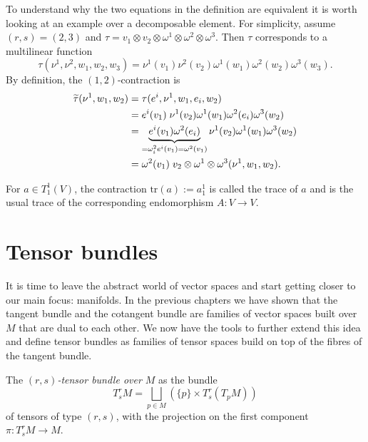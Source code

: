 \begin{example}
  To understand why the two equations in the definition are equivalent it is worth looking at an example over a decomposable element.
  For simplicity, assume $(r,s) = (2,3)$ and $\tau = v_1\otimes v_2\otimes\omega^1\otimes\omega^2\otimes\omega^3$.
  Then $\tau$ corresponds to a multilinear function
  \begin{equation}
    \tau(\nu^1,\nu^2,w_1,w_2,w_3) = \nu^1(v_1)\nu^2(v_2)\omega^1(w_1)\omega^2(w_2)\omega^3(w_3).
  \end{equation}
  By definition, the $(1,2)$-contraction is
  \begin{align}
    \widetilde\tau(\nu^1,w_1,w_2) & = \tau(e^i,\nu^1,w_1,e_i,w_2)                                                                                        \\
                                  & = e^i(v_1)\;\nu^1(v_2)\omega^1(w_1)\omega^2(e_i)\omega^3(w_2)                                                        \\
                                  & = \LaTeXunderbrace{e^i(v_1)\omega^2(e_i)}_{=\omega^2_i e^i (v_1) =\omega^2(v_1)}\nu^1(v_2)\omega^1(w_1)\omega^3(w_2) \\
                                  & = \omega^2(v_1)\; v_2\otimes\omega^1\otimes\omega^3 (\nu^1,w_1,w_2).
  \end{align}
\end{example}

\begin{example}
  For $a\in T_1^1(V)$, the contraction $\mathrm{tr} (a) := a^1_1$ is called the trace of $a$ and is the usual trace of the corresponding endomorphism $A:V\to V$.
\end{example}

\section{Tensor bundles}

It is time to leave the abstract world of vector spaces and start getting closer to our main focus: manifolds.
In the previous chapters we have shown that the tangent bundle and the cotangent bundle are families of vector spaces built over $M$ that are dual to each other.
We now have the tools to further extend this idea and define tensor bundles as families of tensor spaces build on top of the fibres of the tangent bundle.

\begin{definition}
  The \emph{$(r,s)$-tensor bundle over $M$} as the bundle
  \begin{equation}
    T_s^r M = \bigsqcup_{p\in M}\left(\{p\}\times T_s^r(T_p M)\right)
  \end{equation}
  of tensors of type $(r,s)$, with the projection on the first component $\pi:T_s^r M\to M$.
\end{definition}

